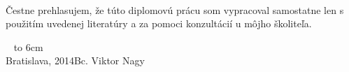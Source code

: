 \documentclass[12pt, a4paper, oneside]{book}
\newcommand\mfauthor{Bc. Viktor Nagy}
\newcommand\mfplacedate{Bratislava, 2014}
\begin{document}
\begin{figure}[H]
\begin{center}
\label{img:zadanie}
\end{center}
\end{figure}


\noindent
\begin{minipage}{0.25\textwidth}~\end{minipage}
\begin{minipage}{0.75\textwidth}
Čestne prehlasujem, že túto diplomovú prácu som vypracoval samostatne len s použitím uvedenej literatúry a za pomoci konzultácií u môjho školiteľa.
\newline \newline
\end{minipage}
\vfill
~ \hfill {\hbox to 6cm{\dotfill}} \\
\mfplacedate \hfill \mfauthor
\vfill\eject 
\end{document}
